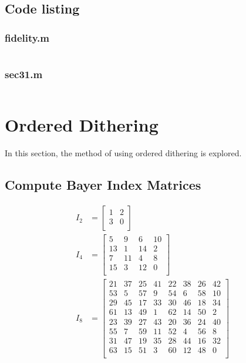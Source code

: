 \documentclass{article}
\begin{document}
\subsection{Code listing}
	\subsubsection{fidelity.m}
	\inputminted[tabsize=2]{matlab}{../source/fidelity.m}
	\subsubsection{sec31.m}
	\inputminted[tabsize=2]{matlab}{../source/sec31.m}


\section{Ordered Dithering}

	In this section, the method of using ordered dithering is explored.

\subsection{Compute Bayer Index Matrices}
	\begin{align*}
		I_{2} &=
		\begin{bmatrix}
			1 & 2 \\
			3 & 0 \\
		\end{bmatrix}
		\\
		I_{4} &=
		\begin{bmatrix}
			5 & 9 & 6 & 10 \\
			13 & 1 & 14 & 2 \\
			7 & 11 & 4 & 8 \\
			15 & 3 & 12 & 0 \\
		\end{bmatrix}
		\\
		I_{8} &=
		\begin{bmatrix}
			21 & 37 & 25 & 41 & 22 & 38 & 26 & 42 \\
			53 & 5 & 57 & 9 & 54 & 6 & 58 & 10 \\
			29 & 45 & 17 & 33 & 30 & 46 & 18 & 34 \\
			61 & 13 & 49 & 1 & 62 & 14 & 50 & 2 \\
			23 & 39 & 27 & 43 & 20 & 36 & 24 & 40 \\
			55 & 7 & 59 & 11 & 52 & 4 & 56 & 8 \\
			31 & 47 & 19 & 35 & 28 & 44 & 16 & 32 \\
			63 & 15 & 51 & 3 & 60 & 12 & 48 & 0 \\
		\end{bmatrix}
	\end{align*}
\end{document}
